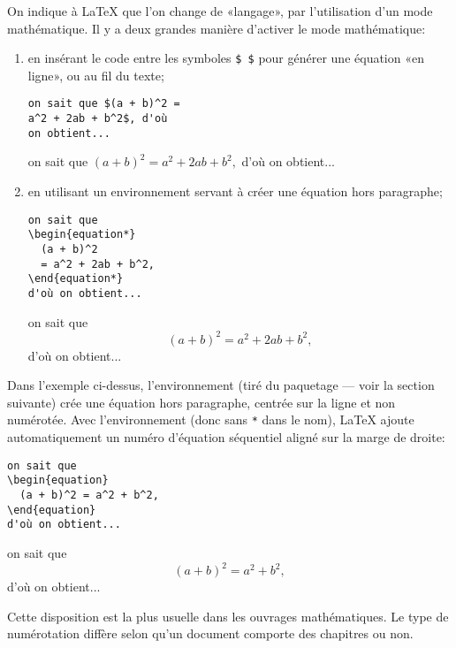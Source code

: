 On indique à {\LaTeX} que l'on change de «langage», par l'utilisation
d'un mode mathématique. Il y a deux grandes manière d'activer le mode
mathématique:
\begin{enumerate}
\item en insérant le code entre les symboles \verb=$ $= pour générer
  une équation «en ligne», ou au fil du texte;
  \begin{demo}
    \begin{texample}
\begin{lstlisting}
on sait que $(a + b)^2 =
a^2 + 2ab + b^2$, d'où
on obtient...
\end{lstlisting}
      \producing
      on sait que $(a + b)^2 = a^2 + 2ab + b^2,$ d'où on obtient...
    \end{texample}
  \end{demo}
\item en utilisant un environnement servant à créer une équation hors
  paragraphe;
  \begin{demo}
    \begin{texample}
\begin{lstlisting}
on sait que
\begin{equation*}
  (a + b)^2
  = a^2 + 2ab + b^2,
\end{equation*}
d'où on obtient...
\end{lstlisting}
      \producing
      on sait que
      \begin{equation*}
        (a + b)^2 = a^2 + 2ab + b^2,
      \end{equation*}
      d'où on obtient...
    \end{texample}
  \end{demo}
\end{enumerate}

Dans l'exemple ci-dessus, l'environnement  (tiré du
paquetage  --- voir la section suivante) crée une
équation hors paragraphe, centrée sur la ligne et non numérotée. Avec
l'environnement  (donc sans \verb=*= dans le nom),
{\LaTeX} ajoute automatiquement un numéro d'équation séquentiel aligné
sur la marge de droite:
\begin{demo}
  \begin{texample}
\begin{lstlisting}
on sait que
\begin{equation}
  (a + b)^2 = a^2 + b^2,
\end{equation}
d'où on obtient...
\end{lstlisting}
    \producing
    on sait que
    \begin{equation}
      (a + b)^2 = a^2 + b^2,
    \end{equation}
    d'où on obtient...
  \end{texample}
\end{demo}
Cette disposition est la plus usuelle dans les ouvrages mathématiques.
Le type de numérotation diffère selon qu'un document comporte des
chapitres ou non.

